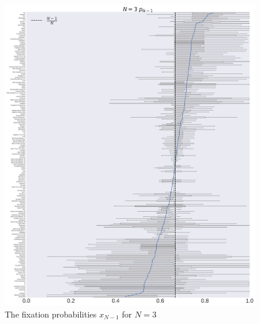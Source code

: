 \documentclass[10pt,letterpaper]{article}
\begin{document}
\begin{figure}[!hbtp]
    \centering
    \includegraphics[width=\textwidth]{./boxplot_3_resist.pdf}
    \caption{The fixation probabilities \(x_{N-1}\) for \(N=3\)}
    \label{resistance-3}
\end{figure}
\end{document}
